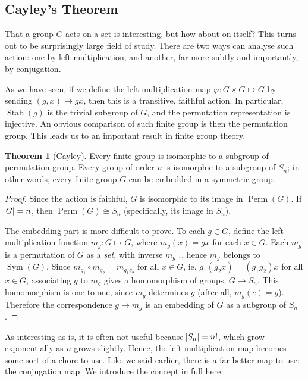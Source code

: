 \documentclass[11pt]{amsart} %
\theoremstyle{definition}
\newtheorem{theorem}[definition]{Theorem}
\theoremstyle{definition}
\DeclareMathOperator{\stab}{Stab}
\DeclareMathOperator{\perm}{Perm}
\DeclareMathOperator{\sym}{Sym}
\numberwithin{equation}{section}
\begin{document}
\subsection{Cayley's Theorem}

That a group $G$ acts on a set is interesting, but how about on itself? This turns out to be surprisingly large field of study. There are two ways can analyse such action: one by left multiplication, and another, far more subtly and importantly, by conjugation.

As we have seen, if we define the left multiplication map $\varphi : G \times G \mapsto G$ by sending $(g,x) \to gx$, then this is a transitive, faithful action. In particular, $\stab (g)$ is the trivial subgroup of $G$, and the permutation representation is injective. An obvious comparison of such finite group is then the permutation group. This leads us to an important result in finite group theory.

\begin{theorem}[Cayley]
	\label{thmcayley}
	Every finite group is isomorphic to a subgroup of permutation group. Every group of order $n$ is isomorphic to a subgroup of $S_n$; in other words, every finite group $G$ can be embedded in a symmetric group.
\end{theorem}

\begin{proof}
	Since the action is faithful, $G $ is isomorphic to its image in $\perm (G)$. If $\abs{G} = n$, then $\perm(G) \cong S_n$ (specifically, its image in $S_n$).
	
	The embedding part is more difficult to prove. To each $g \in G$, define the left multiplication function $m_g: G \mapsto G$, where $m_g(x) = gx$
	for each $ x \in G$. Each $m_g$ is a permutation of $G$ as a \textit{set}, with inverse $m_{g^{-1}}$, hence $m_g $ belongs to $\sym (G)$. Since $m_{g_1} \circ m_{g_2} = m_{g_1 g_2}$ for all $x \in G$, ie. $g_1(g_2 x) = (g_1 g_2)x$ for all $x \in G$, associating $g$ to $m_g$ gives a homomorphism of groups, $G \to S_n$. This homomorphism is one-to-one, since $m_g$ determines $g$ (after all, $m_g (e) = g$). Therefore the correspondence $g \to m_g$ is an embedding of $G$ as a subgroup of $S_n$.
\end{proof}

As interesting as  is, it is often not useful because $\abs{S_n} = n!$, which grow exponentially as $n$ grows slightly. Hence, the left multiplication map becomes some sort of a chore to use. Like we said earlier, there is a far better map to use: the conjugation map. We introduce the concept in full here.
\end{document}
